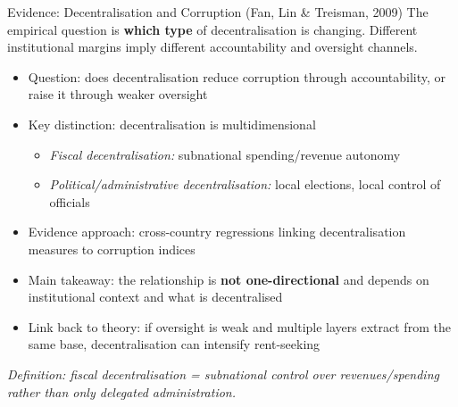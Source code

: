 \documentclass[10pt]{beamer}
\begin{document}
\begin{frame}[allowframebreaks]{Evidence: Decentralisation and Corruption (Fan, Lin \& Treisman, 2009)}
\small
The empirical question is \textbf{which type} of decentralisation is changing.
Different institutional margins imply different accountability and oversight channels.

\begin{itemize}
\item Question: does decentralisation reduce corruption through accountability, or raise it through weaker oversight
\item Key distinction: decentralisation is multidimensional
\begin{itemize}
\item \textit{Fiscal decentralisation:} subnational spending/revenue autonomy
\item \textit{Political/administrative decentralisation:} local elections, local control of officials
\end{itemize}
\item Evidence approach: cross-country regressions linking decentralisation measures to corruption indices
\item Main takeaway: the relationship is \textbf{not one-directional} and depends on institutional context and what is decentralised
\item Link back to theory: if oversight is weak and multiple layers extract from the same base, decentralisation can intensify rent-seeking
\end{itemize}

\vspace{0.1cm}
\footnotesize
\textit{Definition: fiscal decentralisation = subnational control over revenues/spending rather than only delegated administration.}
\end{frame}
\end{document}

